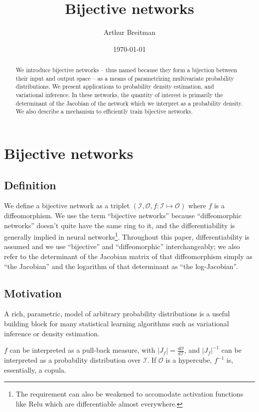 \documentclass{article}
\title{Bijective networks}
\author{Arthur Breitman}
\date{\today}
\begin{document}
\maketitle

\begin{abstract}
  We introduce bijective networks -- thus named because they form a bijection
  between their input and output space -- as a means of parametrizing
  multivariate probability distributions. We present applications to probability
  density estimation, and variational inference. In these networks, the quantity
  of interest is primarily the determinant of the Jacobian of the network which
  we interpret as a probability density. We also describe a mechanism to
  efficiently train bijective networks.
\end{abstract}

\section{Bijective networks}

\subsection{Definition}

We define a bijective network as a triplet
\((\mathcal{I}, \mathcal{O}, f  : \mathcal{I} \mapsto \mathcal{O})\)
where \(f\) is a diffeomorphism. We use the term ``bijective networks''
because ``diffeomorphic networks'' doesn't quite have the same ring to it,
and the differentiability is generally implied in neural networks\footnote{The
requirement can also be weakened to accomodate activation functions like
\textrm{Relu} which are differentiable almost everywhere.}.
Throughout this paper, differentiability is assumed and we use ``bijective''
and ``diffeomorphic'' interchangeably; we also refer to the determinant of the
Jacobian matrix of that diffeomorphism simply as ``the Jacobian'' and the
logarithm of that determinant as ``the log-Jacobian''.

\subsection{Motivation}

A rich, parametric, model of arbitrary probability distributions is a useful
building block for many  statistical learning algorithms such as variational
inference or density estimation.

\(f\) can be interpreted as a pull-back  measure, with
\(\left|J_f\right| = \frac{d \mathcal{O}}{d \mathcal{I}}\), and
\(\left|J_f\right|^{-1}\) can be interpreted as a probability distribution
over \(\mathcal{I}\). If \(\mathcal{O}\) is a hypercube, \(f^{-1}\) is,
essentially, a copula.
\end{document}
